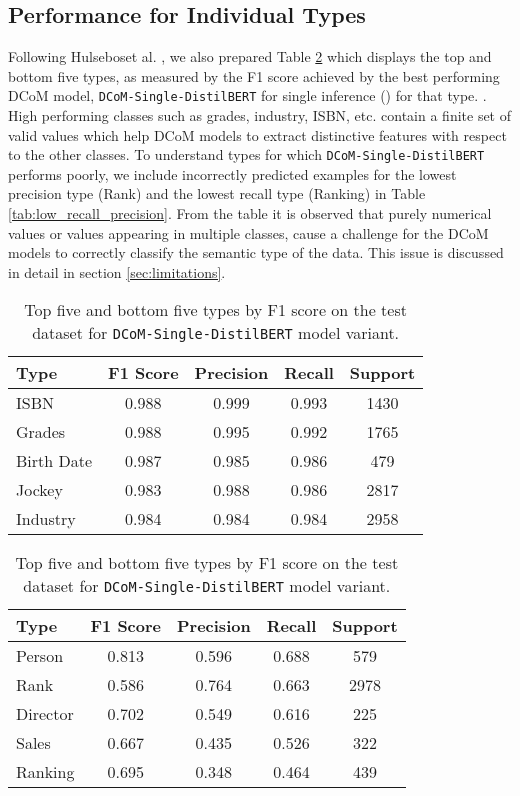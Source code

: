 \documentclass{article}
\begin{document}
\subsection{Performance for Individual Types}
Following Hulseboset al. \cite{Hulsebos}, we also prepared Table \ref{tab:top_bottom_f1} which displays the top and bottom five types, as measured by the F1 score achieved by the best performing DCoM model, \texttt{DCoM-Single-DistilBERT} for single inference () for that type. . High performing classes such as grades, industry, ISBN, etc. contain a finite set of valid values which help DCoM models to extract distinctive features with respect to the other classes. To understand types for which \texttt{DCoM-Single-DistilBERT} performs poorly, we include incorrectly predicted examples for the lowest precision type (Rank) and the lowest recall type (Ranking) in Table \ref{tab:low_recall_precision}. From the table it is observed that purely numerical values or values appearing in multiple classes, cause a challenge for the DCoM models to correctly classify the semantic type of the data. This issue is discussed in detail in section \ref{sec:limitations}.

\begin{table}[ht]
	\centering
	\begin{adjustbox}{center}
		\begin{tabular}{lcccc}
			\hline
			\textbf{Type} & \textbf{F1 Score} & \textbf{Precision} & \textbf{Recall} & \textbf{Support}\\
			\hline
			ISBN & 0.988 & 0.999 & 0.993 & 1430 \\
			Grades  & 0.988 & 0.995 & 0.992 & 1765 \\
			Birth Date & 0.987 & 0.985 & 0.986 & 479 \\
			Jockey & 0.983 & 0.988 & 0.986 & 2817 \\
			Industry & 0.984 & 0.984 & 0.984 & 2958 \\
			\hline
		\end{tabular}
	\end{adjustbox}
	\caption*{(a) Top 5 types by F1 Score}

	
	\begin{adjustbox}{center}
		\begin{tabular}{lcccc}
			\hline
			\textbf{Type} & \textbf{F1 Score} & \textbf{Precision} & \textbf{Recall} & \textbf{Support}\\
			\hline
			Person & 0.813 & 0.596 & 0.688 & 579 \\
			Rank  & 0.586 & 0.764 & 0.663 & 2978 \\
			Director & 0.702 & 0.549 & 0.616 & 225 \\
			Sales & 0.667 & 0.435 & 0.526 & 322 \\
			Ranking & 0.695 & 0.348 & 0.464 & 439 \\
			\hline
		\end{tabular}
	\end{adjustbox}
	\caption*{(a) Bottom 5 types by F1 Score}
	\caption{Top five and bottom five types by F1 score on the test dataset for \texttt{DCoM-Single-DistilBERT} model variant.}
	\label{tab:top_bottom_f1}
\end{table}
\end{document}

